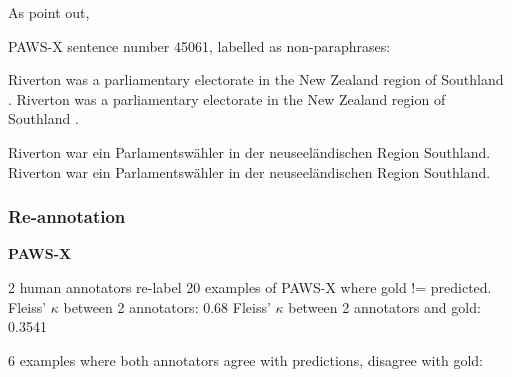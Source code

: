 As \citep{caswell2021quality} point out,


PAWS-X sentence number 45061, labelled as non-paraphrases:

Riverton was a parliamentary electorate in the New Zealand region of Southland .
Riverton was a parliamentary electorate in the New Zealand region of Southland .

Riverton war ein Parlamentswähler in der neuseeländischen Region Southland.
Riverton war ein Parlamentswähler in der neuseeländischen Region Southland.


\subsubsection{Re-annotation}

\textbf{PAWS-X}

2 human annotators re-label 20 examples of PAWS-X where gold != predicted.
Fleiss' $\kappa$ between 2 annotators: 0.68
Fleiss' $\kappa$ between 2 annotators and gold: 0.3541

6 examples where both annotators agree with predictions, disagree with gold:

